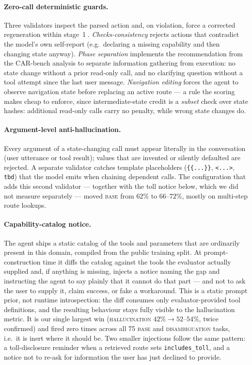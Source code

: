 \documentclass{article}
\begin{document}
\paragraph{Zero-call deterministic guards.}
Three validators inspect the parsed action and, on violation, force a
corrected regeneration within stage~\textcircled{1}.
\emph{Checks-consistency} rejects actions that contradict the model's
own self-report (e.g.\ declaring a missing capability and then changing
state anyway). \emph{Phase separation} implements the recommendation
from the CAR-bench analysis to separate information gathering from
execution: no state change without a prior read-only call, and no
clarifying question without a tool attempt since the last user message.
\emph{Navigation editing} forces the agent to observe navigation state
before replacing an active route --- a rule the scoring makes cheap to
enforce, since intermediate-state credit is a \emph{subset} check over
state hashes: additional read-only calls carry no penalty, while wrong
state changes do.

\paragraph{Argument-level anti-hallucination.}
Every argument of a state-changing call must appear literally in the
conversation (user utterance or tool result); values that are invented
or silently defaulted are rejected. A separate validator catches
template placeholders (\texttt{\{\{...\}\}}, \texttt{<...>},
\texttt{tbd}) that the model emits when chaining dependent calls. The
configuration that adds this second validator --- together with the
toll notice below, which we did not measure separately --- moved
\textsc{base} from $62\%$ to $66$--$72\%$, mostly on multi-step route
lookups.

\paragraph{Capability-catalog notice.}
The agent ships a static catalog of the tools and parameters that are
ordinarily present in this domain, compiled from the public training
split. At prompt-construction time it diffs the catalog against the
tools the evaluator actually supplied and, if anything is missing,
injects a notice naming the gap and instructing the agent to say
plainly that it cannot do that part --- and not to ask the user to
supply it, claim success, or fake a workaround. This is a static prompt
prior, not runtime introspection: the diff consumes only
evaluator-provided tool definitions, and the resulting behaviour stays
fully visible to the hallucination metric. It is our single largest
win (\textsc{hallucination} $42\% \rightarrow 52$--$54\%$, twice
confirmed) and fired zero times across all 75 \textsc{base} and
\textsc{disambiguation} tasks, i.e.\ it is inert where it should be.
Two smaller injections follow the same pattern: a toll-disclosure
reminder when a retrieved route sets \texttt{includes\_toll}, and a
notice not to re-ask for information the user has just declined to
provide.
\end{document}
